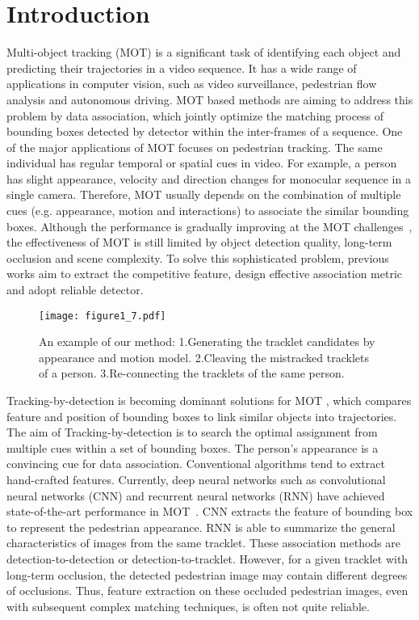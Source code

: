\documentclass[5pt]{article}
\begin{document}
\section{Introduction}
\vspace{-0.1cm}
\label{sec:intro}
Multi-object tracking (MOT) is a significant task of identifying each object and predicting their trajectories in a video sequence. It has a wide range of applications in computer vision, such as video surveillance, pedestrian flow analysis and autonomous driving. MOT based methods are aiming to address this problem by data association, which jointly optimize the matching process of bounding boxes detected by detector within the inter-frames of a sequence. One of the major applications of MOT focuses on pedestrian tracking.  The same individual has regular temporal or spatial cues in video. For example, a person has slight appearance, velocity and direction changes for monocular sequence in a single camera. Therefore, MOT usually depends on the combination of multiple cues (e.g. appearance, motion and interactions) to associate the similar bounding boxes. Although the performance is gradually improving at the MOT challenges~\cite{DBLP:journals/corr/MilanL0RS16}, the effectiveness of MOT is still limited by object detection quality, long-term occlusion and scene complexity. To solve this sophisticated problem, previous works aim to extract the competitive feature, design effective association metric and adopt reliable detector.
\begin{figure}
    \centering
    \texttt{[image: figure1\_7.pdf]}
    \caption{An example of our method: 1.Generating the tracklet candidates by appearance and motion model. 2.Cleaving the mistracked tracklets of a person. 3.Re-connecting the tracklets of the same person.}
    \vspace{-0.4cm}
\end{figure}

Tracking-by-detection is becoming dominant solutions for MOT , which compares feature and position of bounding boxes to link similar objects into trajectories. The aim of Tracking-by-detection is to search the optimal assignment from multiple cues within a set of bounding boxes. The person's appearance is a convincing cue for data association. Conventional algorithms tend to extract hand-crafted features. Currently, deep neural networks such as convolutional neural networks (CNN) and recurrent neural networks (RNN) have achieved state-of-the-art performance in MOT~\cite{tang2017multiple,chu2017online,sadeghian2017tracking}. CNN extracts the feature of bounding box to represent the pedestrian appearance. RNN is able to summarize the general characteristics of images from the same tracklet. These association methods are detection-to-detection or detection-to-tracklet. However, for a given tracklet with long-term occlusion, the detected pedestrian image may contain different degrees of occlusions. Thus, feature extraction on these occluded pedestrian images, even with subsequent complex matching techniques, is often not quite reliable.
\end{document}
